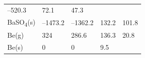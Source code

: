 \documentclass[
  9pt,
]{extbook}
\theoremstyle{definition}
\theoremstyle{definition}
\theoremstyle{definition}
\theoremstyle{remark}
\begin{document}
\begin{longtable}[]{@{}lllll@{}}
\begin{minipage}[t]{0.20\columnwidth}
--520.3\strut
\end{minipage} & \begin{minipage}[t]{0.18\columnwidth}\raggedright
72.1\strut
\end{minipage} & \begin{minipage}[t]{0.18\columnwidth}\raggedright
47.3\strut
\end{minipage}\tabularnewline
\begin{minipage}[t]{0.10\columnwidth}\raggedright
BaSO\textsubscript{4}(s)\strut
\end{minipage} & \begin{minipage}[t]{0.19\columnwidth}\raggedright
--1473.2\strut
\end{minipage} & \begin{minipage}[t]{0.20\columnwidth}\raggedright
--1362.2\strut
\end{minipage} & \begin{minipage}[t]{0.18\columnwidth}\raggedright
132.2\strut
\end{minipage} & \begin{minipage}[t]{0.18\columnwidth}\raggedright
101.8\strut
\end{minipage}\tabularnewline
\begin{minipage}[t]{0.10\columnwidth}\raggedright
Be(g)\strut
\end{minipage} & \begin{minipage}[t]{0.19\columnwidth}\raggedright
324\strut
\end{minipage} & \begin{minipage}[t]{0.20\columnwidth}\raggedright
286.6\strut
\end{minipage} & \begin{minipage}[t]{0.18\columnwidth}\raggedright
136.3\strut
\end{minipage} & \begin{minipage}[t]{0.18\columnwidth}\raggedright
20.8\strut
\end{minipage}\tabularnewline
\begin{minipage}[t]{0.10\columnwidth}\raggedright
Be(s)\strut
\end{minipage} & \begin{minipage}[t]{0.19\columnwidth}\raggedright
0\strut
\end{minipage} & \begin{minipage}[t]{0.20\columnwidth}\raggedright
0\strut
\end{minipage} & \begin{minipage}[t]{0.18\columnwidth}\raggedright
9.5\strut

\end{minipage}
\end{longtable}
\end{document}
